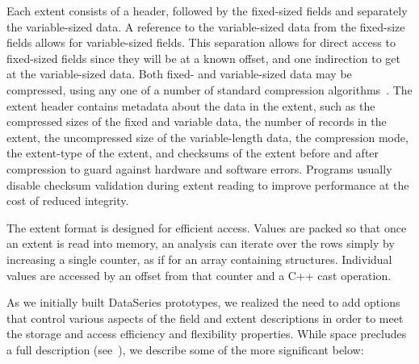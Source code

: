 \documentclass{acm_proc_article-sp}
\begin{document}
Each extent consists of a header, followed by the fixed-sized fields
and separately the variable-sized data.  A reference to the 
variable-sized data from the fixed-size fields allows for variable-sized
fields.  This separation allows for direct access to fixed-sized
fields since they will be at a known offset, and one indirection to
get at the variable-sized data.  Both fixed- and variable-sized data
may be compressed, using any one of a number of standard compression
algorithms~\cite{BZIP,GZIP,LZF,LZO}.  The extent header contains
metadata about the data in the extent, such as the compressed sizes of
the fixed and variable data, the number of records in the extent, the
uncompressed size of the variable-length data, the compression mode,
the extent-type of the extent, and checksums of the extent before and
after compression to guard against hardware and software errors.
Programs usually disable checksum validation during extent reading to
improve performance at the cost of reduced integrity.

The extent format is designed for efficient access. Values are packed
so that once an extent is read into memory, an analysis can iterate
over the rows simply by increasing a single counter, as if for an
array containing structures.  Individual values are accessed by an
offset from that counter and a C++ cast operation. 

As we initially built DataSeries prototypes, we realized the need to
add options that control various aspects of the field and extent
descriptions in order to meet the storage and access efficiency and
flexibility properties.  While space precludes a full description
(see~\cite{DSTechnicalReportSnapshot}), we describe some of the more
significant below:
\end{document}
